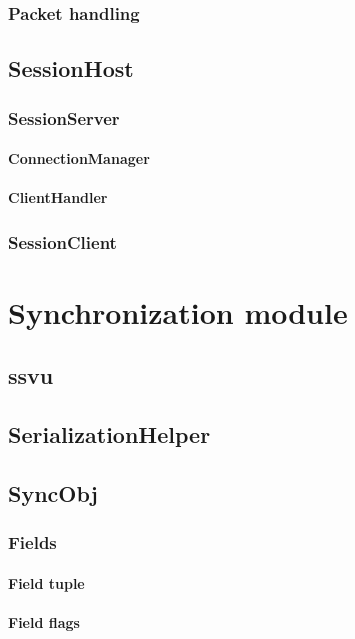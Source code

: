 \documentclass{report}
\begin{document}
			\subsection{Packet handling}

		\section{SessionHost}
			\subsection{SessionServer}
				\subsubsection{ConnectionManager}
				\subsubsection{ClientHandler}
			
			\subsection{SessionClient}

	\newpage

	\chapter{Synchronization module}
		\section{ssvu}

		\section{SerializationHelper}

		\section{SyncObj}
			\subsection{Fields}
				\subsubsection{Field tuple}
				\subsubsection{Field flags}
\end{document}
